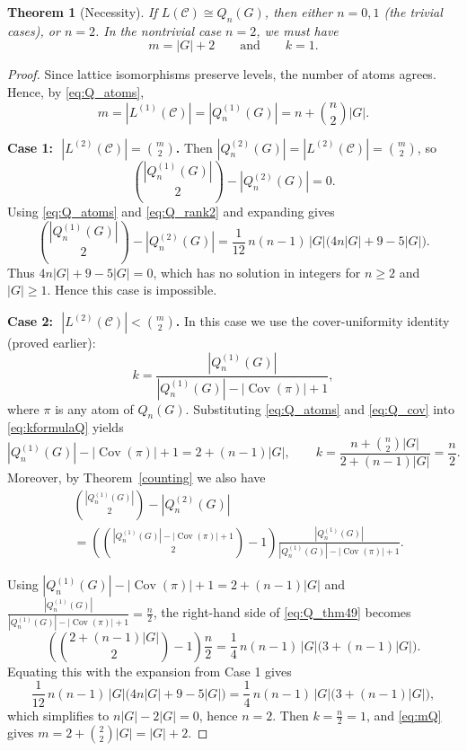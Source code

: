 \documentclass{article}
\newtheorem{theorem}{Theorem}[section]
\begin{document}
\begin{theorem}[Necessity]\label{thm:Qn-necessary}
If \(L(\mathcal C)\cong Q_n(G)\), then either \(n=0,1\) (the trivial cases), or \(n=2\).
In the nontrivial case \(n=2\), we must have
\[
m=|G|+2
\qquad\text{and}\qquad
k=1.
\]
\end{theorem}

\begin{proof}
Since lattice isomorphisms preserve levels, the number of atoms agrees. Hence, by \eqref{eq:Q_atoms},
\begin{equation}\label{eq:mQ}
m=|L^{(1)}(\mathcal C)|=|Q_n^{(1)}(G)|=n+\binom{n}{2}|G|.
\end{equation}

\medskip
\noindent\textbf{Case 1: \(\;|L^{(2)}(\mathcal C)|=\binom{m}{2}\).}
Then \(|Q_n^{(2)}(G)|=|L^{(2)}(\mathcal C)|=\binom{m}{2}\), so
\[
\binom{|Q_n^{(1)}(G)|}{2}-|Q_n^{(2)}(G)|=0.
\]
Using \eqref{eq:Q_atoms} and \eqref{eq:Q_rank2} and expanding gives
\[
\binom{|Q_n^{(1)}(G)|}{2}-|Q_n^{(2)}(G)|
=\frac{1}{12}\,n(n-1)\,|G|\bigl(4n|G|+9-5|G|\bigr).
\]
Thus \(4n|G|+9-5|G|=0\), which has no solution in integers for \(n\ge 2\) and \(|G|\ge 1\).
Hence this case is impossible.

\medskip
\noindent\textbf{Case 2: \(\;|L^{(2)}(\mathcal C)|<\binom{m}{2}\).}
In this case we use the cover-uniformity identity (proved earlier):
\begin{equation}\label{eq:kformulaQ}
k=\frac{|Q_n^{(1)}(G)|}{|Q_n^{(1)}(G)|-|\operatorname{Cov}(\pi)|+1},
\end{equation}
where \(\pi\) is any atom of \(Q_n(G)\).
Substituting \eqref{eq:Q_atoms} and \eqref{eq:Q_cov} into \eqref{eq:kformulaQ} yields
\[
|Q_n^{(1)}(G)|-|\operatorname{Cov}(\pi)|+1
=2+(n-1)|G|,
\qquad
k=\frac{n+\binom{n}{2}|G|}{2+(n-1)|G|}=\frac{n}{2}.
\]
Moreover, by Theorem~\ref{counting} we also have
\begin{equation}\label{eq:Q_thm49}
\begin{aligned}
&\binom{|Q_n^{(1)}(G)|}{2}-|Q_n^{(2)}(G)|
\\
&=\left(\binom{|Q_n^{(1)}(G)|-|\operatorname{Cov}(\pi)|+1}{2}-1\right)
\frac{|Q_n^{(1)}(G)|}{|Q_n^{(1)}(G)|-|\operatorname{Cov}(\pi)|+1}.
\end{aligned}
\end{equation}


Using \( |Q_n^{(1)}(G)|-|\operatorname{Cov}(\pi)|+1 = 2+(n-1)|G|\) and \(\frac{|Q_n^{(1)}(G)|}{|Q_n^{(1)}(G)|-|\operatorname{Cov}(\pi)|+1}=\frac n2\), the right-hand side of \eqref{eq:Q_thm49} becomes
\[
\left(\binom{2+(n-1)|G|}{2}-1\right)\frac n2
=\frac14\,n(n-1)\,|G|\bigl(3+(n-1)|G|\bigr).
\]
Equating this with the expansion from Case 1 gives
\[
\frac{1}{12}\,n(n-1)\,|G|\bigl(4n|G|+9-5|G|\bigr)
=\frac14\,n(n-1)\,|G|\bigl(3+(n-1)|G|\bigr),
\]
which simplifies to \(n|G|-2|G|=0\), hence \(n=2\).
Then \(k=\frac n2=1\), and \eqref{eq:mQ} gives \(m=2+\binom22|G|=|G|+2\).
\end{proof}
\end{document}

